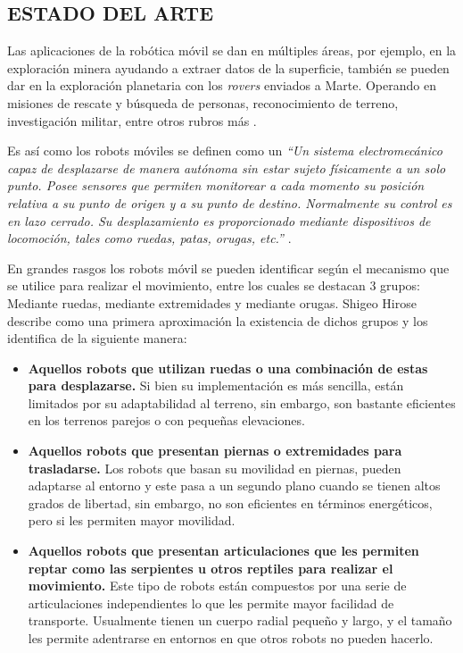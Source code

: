 \newpage
\subsection{ESTADO DEL ARTE}

Las aplicaciones de la robótica móvil se dan en múltiples áreas, por ejemplo, en la exploración minera ayudando a extraer datos de la superficie, también se pueden dar en la exploración planetaria con los \textit{rovers} enviados a Marte. Operando en misiones de rescate y búsqueda de personas, reconocimiento de terreno, investigación militar, entre otros rubros más \cite{russell_artificial_2010}.

Es así como los robots móviles se definen como un \textit{``Un sistema electromecánico capaz de desplazarse de manera autónoma sin estar sujeto físicamente a un solo punto. Posee sensores que permiten monitorear a cada momento su posición relativa a su punto de origen y a su punto de destino. Normalmente su control es en lazo cerrado. Su desplazamiento es proporcionado mediante dispositivos de locomoción, tales como ruedas, patas, orugas, etc.''} \cite{sotelo_robots_2007}. 

En grandes rasgos los robots móvil se pueden identificar según el mecanismo que se utilice para realizar el movimiento, entre los cuales se destacan 3 grupos: Mediante ruedas, mediante extremidades y mediante orugas. Shigeo Hirose \cite{hirose_three_1991} describe como una primera aproximación la existencia de dichos grupos y los identifica de la siguiente manera:
\begin{itemize}
    \item \textbf{Aquellos robots que utilizan ruedas o una combinación de estas para desplazarse.} Si bien su implementación es más sencilla, están limitados por su adaptabilidad al terreno, sin embargo, son bastante eficientes en los terrenos parejos o con pequeñas elevaciones.
    \item \textbf{Aquellos robots que presentan piernas o extremidades para trasladarse.} Los robots que basan su movilidad en piernas, pueden adaptarse al entorno y este pasa a un segundo plano cuando se tienen altos grados de libertad, sin embargo, no son eficientes en términos energéticos, pero si les permiten mayor movilidad.
    \item \textbf{Aquellos robots que presentan articulaciones que les permiten reptar como las serpientes u otros reptiles para realizar el movimiento.} Este tipo de robots están compuestos por una serie de articulaciones independientes lo que les permite mayor facilidad de transporte. Usualmente tienen un cuerpo radial pequeño y largo, y el tamaño les permite adentrarse en entornos en que otros robots no pueden hacerlo.
\end{itemize}

